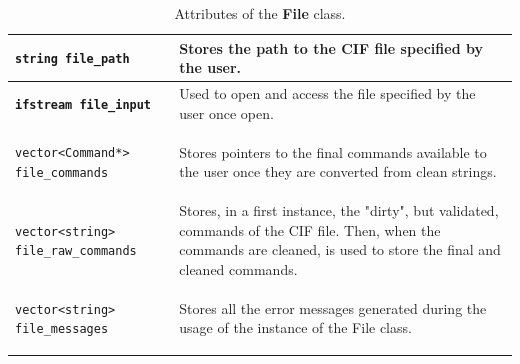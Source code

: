 \documentclass[11pt,twoside,openany,x11names,svgnames]{memoir}
\begin{document}
\begin{table}\footnotesize
\centering
\begin{tabular}{| >{\bfseries}p{5.5cm} | p{10cm} |}
	\hline
	
	\texttt{string file\_path} & Stores the path to the CIF file specified by the user. \\
	
	\hline

	\texttt{ifstream file\_input} & Used to open and access the file specified by the user once open. \\
	
	\hline

	\texttt{vector<Command*> file\_commands} & Stores pointers to the final commands available to the user once they are converted from clean strings. \\
	
	\hline

	\texttt{vector<string> file\_raw\_commands} & Stores, in a first instance, the "dirty", but validated, commands of the CIF file. Then, when the commands are cleaned, is used to store the final and cleaned commands. \\
	
	\hline

	\texttt{vector<string> file\_messages} & Stores all the error messages generated during the usage of the instance of the File class. \\
	
	\hline
\end{tabular}
\caption{Attributes of the \textbf{File} class.}
\label{tab:File-Attributes}
\end{table}
\end{document}
